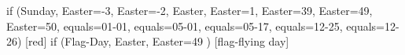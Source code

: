 \documentclass[paper=landscape]{scrartcl}
\begin{document}
\PrintFantasyCalendarYear
  [
    , day text = {}
    , note font = {\color{black}}
    , box outer sep = 5pt
    , box = { rounded corners }
  ]
  {\the\year}
  {
  if (Sunday,
      Easter=-3, %
      Easter=-2, %
      Easter,    %
      Easter=1,  %
      Easter=39, %
      Easter=49, %
      Easter=50, %
      equals=01-01,
      equals=05-01,
      equals=05-17,
      equals=12-25,
      equals=12-26) [red]
  if (Flag-Day,
      Easter,
      Easter=49
      ) [flag-flying day]
  }
\end{document}
